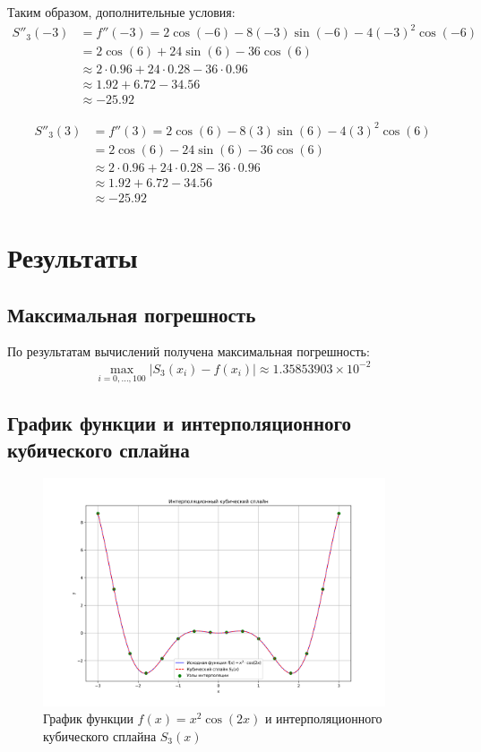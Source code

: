 \documentclass[12pt]{article}
\begin{document}
Таким образом, дополнительные условия:
\begin{align}
S''_3(-3) &= f''(-3) = 2\cos(-6) - 8(-3)\sin(-6) - 4(-3)^2\cos(-6) \\
&= 2\cos(6) + 24\sin(6) - 36\cos(6) \\
&\approx 2 \cdot 0.96 + 24 \cdot 0.28 - 36 \cdot 0.96 \\
&\approx 1.92 + 6.72 - 34.56 \\
&\approx -25.92
\end{align}

\begin{align}
S''_3(3) &= f''(3) = 2\cos(6) - 8(3)\sin(6) - 4(3)^2\cos(6) \\
&= 2\cos(6) - 24\sin(6) - 36\cos(6) \\
&\approx 2 \cdot 0.96 + 24 \cdot 0.28 - 36 \cdot 0.96 \\
&\approx 1.92 + 6.72 - 34.56 \\
&\approx -25.92
\end{align}

\section{Результаты}

\subsection{Максимальная погрешность}

По результатам вычислений получена максимальная погрешность:
\begin{equation}
    \max_{i=0,\ldots,100} |S_3(x_i) - f(x_i)| \approx 1.35853903 \times 10^{-2}
\end{equation}

\subsection{График функции и интерполяционного кубического сплайна}

\begin{figure}[H]
    \centering
    \includegraphics[width=0.9\textwidth]{spline_plot.png}
    \caption{График функции $f(x) = x^2\cos(2x)$ и интерполяционного кубического сплайна $S_3(x)$}
    \label{fig:spline}
\end{figure}
\end{document}
